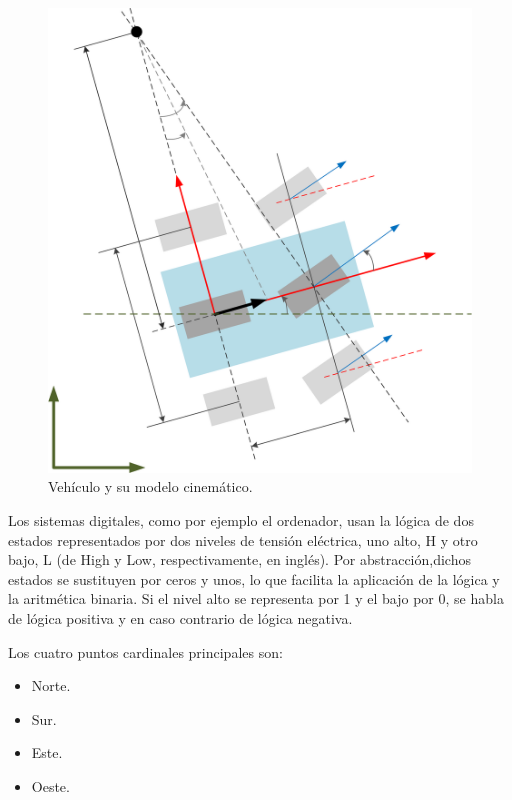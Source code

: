 \documentclass[conference,compsoc,onecolumn]{IEEEtran}
\begin{document}
 \begin{figure}[h!]
\centering
\includegraphics[scale=0.45]{bib/.png}
\caption{Vehículo y su modelo cinemático.}
\label{fig:imagen laboratorio 1}
\end{figure}


Los sistemas digitales, como por ejemplo el ordenador, usan la lógica de dos estados representados por dos
niveles de tensión eléctrica, uno alto, H y otro bajo, L (de High y Low, respectivamente, en inglés). Por abstracción,dichos estados se sustituyen por ceros y unos, lo que facilita la aplicación de la lógica y la aritmética binaria. Si el
nivel alto se representa por 1 y el bajo por 0, se habla de lógica positiva y en caso contrario de lógica negativa.

Los cuatro puntos cardinales principales son:
\begin{itemize}
    \item Norte.
    \item Sur.
    \item Este.
    \item Oeste.
\end{itemize}
\end{document}
